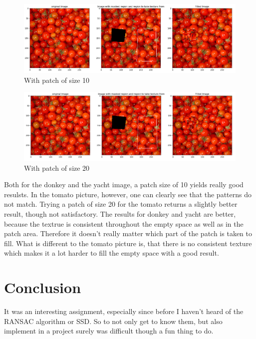\documentclass[12pt]{article}
\begin{document}
\pagebreak

\begin{figure}[!htb]
    \centering
    \includegraphics[width=.8\textwidth]{pics/tomato10}
    \caption{With patch of size 10}
    \end{figure}

\begin{figure}[!htb]
    \centering
    \includegraphics[width=.8\textwidth]{pics/tomato20}
    \caption{With patch of size 20}
    \end{figure}

Both for the donkey and the yacht image, a patch size of 10 yields really good resulsts.
In the tomato picture, however, one can clearly see that the patterns do not match. Trying 
a patch of size 20 for the tomato returns a slightly better result, though not satisfactory.
\newline
The results for donkey and yacht are better, because the textrue is consistent throughout 
the empty space as well as in the patch area. Therefore it doesn't really matter which part
of the patch is taken to fill.
\newline
What is different to the tomato picture is, that there is no consistent texture which makes it 
a lot harder to fill the empty space with a good result.

\section{Conclusion}
It was an interesting assignment, especially since before I haven't heard of the RANSAC algorithm or SSD.
So to not only get to know them, but also implement in a project surely was difficult though a fun thing to do.
\end{document}
